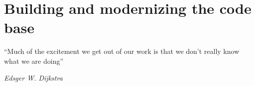 \chapter{Building and modernizing the code base}\label{chap:sit}

\epigraph{``Much of the excitement we get out of our work is that we don't really know what we are doing''}{\textit{Edsger W. Dijkstra}}

